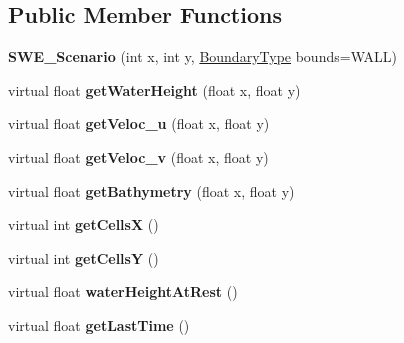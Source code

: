 \subsection*{Public Member Functions}
\begin{DoxyCompactItemize}
\item 
\hypertarget{classSWE__Scenario_a8b7fa4a4a64128d4f37330bb1ff6b26a}{{\bfseries S\-W\-E\-\_\-\-Scenario} (int x, int y, \hyperlink{SWE__Scenario_8hh_af75d5dd7322fa39ed0af4e7839e600f8}{Boundary\-Type} bounds=W\-A\-L\-L)}\label{classSWE__Scenario_a8b7fa4a4a64128d4f37330bb1ff6b26a}

\item 
\hypertarget{classSWE__Scenario_ade6f356d60b1402c034611266462b88b}{virtual float {\bfseries get\-Water\-Height} (float x, float y)}\label{classSWE__Scenario_ade6f356d60b1402c034611266462b88b}

\item 
\hypertarget{classSWE__Scenario_ab1d5e360c861df3c8c0ccd919bd7f495}{virtual float {\bfseries get\-Veloc\-\_\-u} (float x, float y)}\label{classSWE__Scenario_ab1d5e360c861df3c8c0ccd919bd7f495}

\item 
\hypertarget{classSWE__Scenario_afeaf75872a1678ea64e6f7accd1e49c6}{virtual float {\bfseries get\-Veloc\-\_\-v} (float x, float y)}\label{classSWE__Scenario_afeaf75872a1678ea64e6f7accd1e49c6}

\item 
\hypertarget{classSWE__Scenario_afe09a1ba63304800651f25873570a348}{virtual float {\bfseries get\-Bathymetry} (float x, float y)}\label{classSWE__Scenario_afe09a1ba63304800651f25873570a348}

\item 
\hypertarget{classSWE__Scenario_a86f33e15398c7e3de715c4d80e719e7e}{virtual int {\bfseries get\-Cells\-X} ()}\label{classSWE__Scenario_a86f33e15398c7e3de715c4d80e719e7e}

\item 
\hypertarget{classSWE__Scenario_abf002b0277bff080b82583b6012c2632}{virtual int {\bfseries get\-Cells\-Y} ()}\label{classSWE__Scenario_abf002b0277bff080b82583b6012c2632}

\item 
\hypertarget{classSWE__Scenario_a9de0f0f9fcc34dfe00c522b10c343d91}{virtual float {\bfseries water\-Height\-At\-Rest} ()}\label{classSWE__Scenario_a9de0f0f9fcc34dfe00c522b10c343d91}

\item 
\hypertarget{classSWE__Scenario_a7c4d192d17691191acdde72170d53b7f}{virtual float {\bfseries get\-Last\-Time} ()}\label{classSWE__Scenario_a7c4d192d17691191acdde72170d53b7f}


\end{DoxyCompactItemize}
